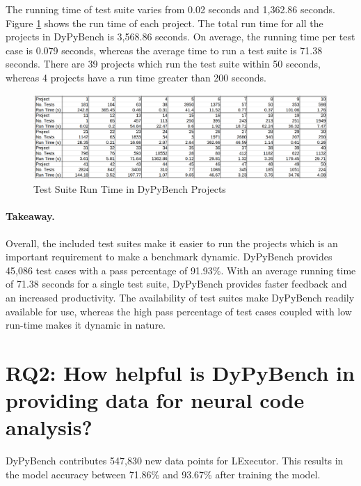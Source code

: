 The running time of test suite varies from 0.02 seconds and 1,362.86 seconds.
Figure \ref{fig:test_run_times} shows the run time of each project.
The total run time for all the projects in DyPyBench is 3,568.86 seconds.
On average, the running time per test case is 0.079 seconds, whereas the average time to run a test suite is 71.38 seconds. 
There are 39 projects which run the test suite within 50 seconds, whereas 4 projects have a run time greater than 200 seconds.
\begin{figure}[ht]
    \centering
    \includegraphics[width=1\linewidth]{figures/evaluation/tests_runtime2.png}
    \caption[Test Suite Run Time]{\label{fig:test_run_times}Test Suite Run Time in DyPyBench Projects}
\end{figure}

\paragraph{Takeaway.} Overall, the included test suites make it easier to run the projects which is an important requirement to make a benchmark dynamic.
DyPyBench provides 45,086 test cases with a pass percentage of 91.93\%. 
With an average running time of 71.38 seconds for a single test suite, DyPyBench provides faster feedback and an increased productivity.
The availability of test suites make DyPyBench readily available for use, whereas the high pass percentage of test cases coupled with low run-time makes it dynamic in nature.

\section{RQ2: How helpful is DyPyBench in providing data for neural code analysis?}

DyPyBench contributes 547,830 new data points for LExecutor. 
This results in the model accuracy between 71.86\% and 93.67\% after training the model.

